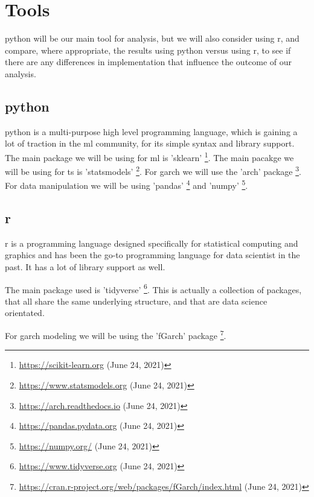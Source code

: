 \chapter{Tools}
\label{chap:tools}
\Gls{python} will be our main tool for analysis, but we will also consider using \Gls{r}, and compare, where appropriate, the results using \Gls{python} versus using \Gls{r}, to see if there are any differences in implementation that influence the outcome of our analysis.

\section{\Gls{python}}
\Gls{python} is a multi-purpose high level programming language, which is gaining a lot of traction in the \acrlong{ml} community, for its simple syntax and library support.
The main package we will be using for \acrlong{ml} is 'sklearn' \footnote{\url{https://scikit-learn.org} (June 24, 2021)}.
The main pacakge we will be using for \acrlong{ts} is 'statsmodels' \footnote{\url{https://www.statsmodels.org} (June 24, 2021)}.
For \acrshort{garch} we will use the 'arch' package \footnote{\url{https://arch.readthedocs.io} (June 24, 2021)}.
For data manipulation we will be using 'pandas' \footnote{\url{https://pandas.pydata.org} (June 24, 2021)} and 'numpy' \footnote{\url{https://numpy.org/} (June 24, 2021)}.

\section{\Gls{r}}
\Gls{r} is a programming language designed specifically for statistical computing and graphics and has been the go-to programming language for data scientist in the past. It has a lot of library support as well.


The main package used is 'tidyverse' \footnote{\url{https://www.tidyverse.org} (June 24, 2021)}. This is actually a collection of packages, that all share the same underlying structure, and that are data science orientated.


For \acrshort{garch} modeling we will be using the 'fGarch' package \footnote{\url{https://cran.r-project.org/web/packages/fGarch/index.html} (June 24, 2021)}.